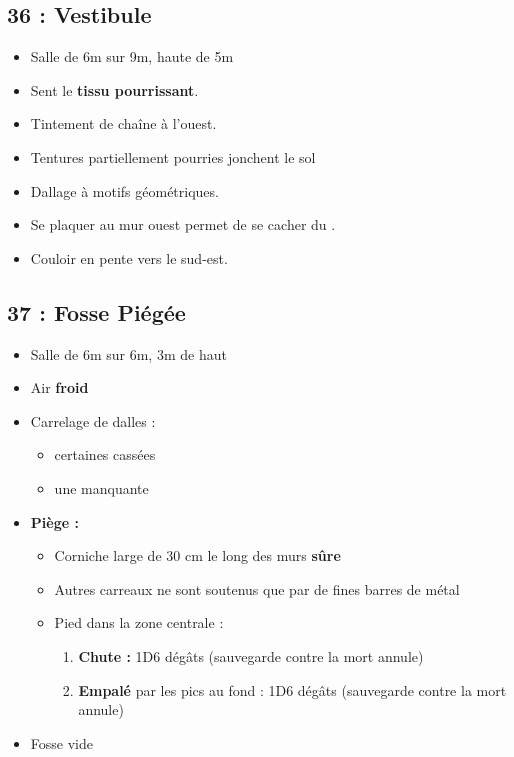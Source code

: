 \subsection{36 : Vestibule}\label{n3:s36}
\begin{itemize}
  \item Salle de 6m sur 9m, haute de 5m
  \item Sent le \textbf{tissu pourrissant}.
  \item Tintement de chaîne à l'ouest.
  \item Tentures partiellement pourries jonchent le sol
  \item Dallage à motifs géométriques.
  \item Se plaquer au mur ouest permet de se cacher du \textbf{}.
  \item Couloir en pente vers le sud-est.
\end{itemize}


\subsection{37 : Fosse Piégée}\label{n3:s37}
\begin{itemize}
  \item Salle de 6m sur 6m, 3m de haut
  \item Air \textbf{froid}
  \item Carrelage de dalles :
  \begin{itemize}
    \item certaines cassées
    \item une manquante
  \end{itemize}
  \item \textbf{Piège :}
  \begin{itemize}
    \item Corniche large de 30 cm le long des murs \textbf{sûre}
    \item Autres carreaux ne sont soutenus que par de fines barres de métal
    \item Pied dans la zone centrale :
    \begin{enumerate}
      \item \textbf{Chute :} 1D6 dégâts (sauvegarde contre la mort annule)
      \item \textbf{Empalé} par les pics au fond : 1D6 dégâts (sauvegarde contre la mort annule)
    \end{enumerate}
  \end{itemize}
  \item Fosse vide
\end{itemize}

